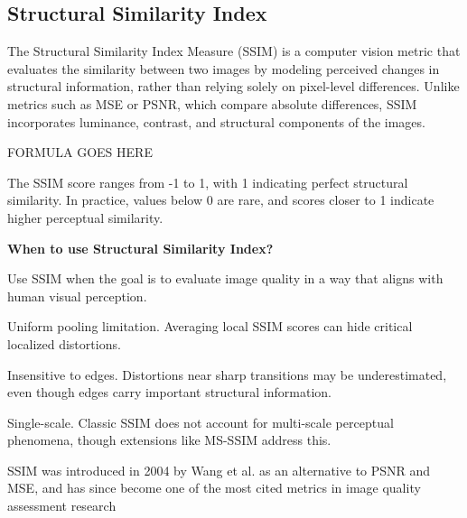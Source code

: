 \subsection{Structural Similarity Index}

The Structural Similarity Index Measure (SSIM) is a computer vision metric that evaluates the similarity
between two images by modeling perceived changes in structural information, rather than relying solely on
pixel-level differences. Unlike metrics such as MSE or PSNR, which compare absolute differences, SSIM
incorporates luminance, contrast, and structural components of the images.

\begin{center}
    FORMULA GOES HERE
\end{center}

The SSIM score ranges from -1 to 1, with 1 indicating perfect structural similarity. In practice, values
below 0 are rare, and scores closer to 1 indicate higher perceptual similarity.

\textbf{When to use Structural Similarity Index?}

Use SSIM when the goal is to evaluate image quality in a way that aligns with human visual perception.

{
\item Uniform pooling limitation. Averaging local SSIM scores can hide critical localized distortions.
\item Insensitive to edges. Distortions near sharp transitions may be underestimated, even though edges carry
important structural information.
\item Single-scale. Classic SSIM does not account for multi-scale perceptual phenomena, though extensions
like MS-SSIM address this.
}

\clearpage

\thispagestyle{customstyle}

{SSIM was introduced in 2004 by Wang et al. as an alternative to PSNR and MSE, and has since become one of
the most cited metrics in image quality assessment research}